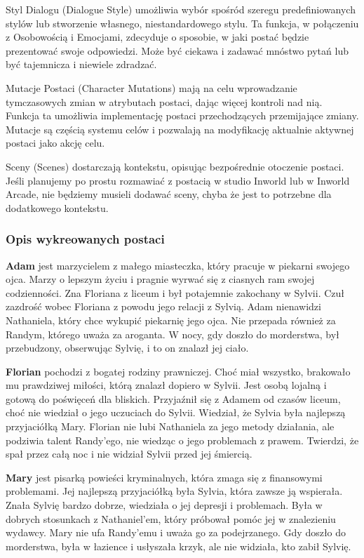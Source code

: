 Styl Dialogu (Dialogue Style) umożliwia wybór spośród szeregu predefiniowanych stylów lub stworzenie
własnego, niestandardowego stylu. Ta funkcja, w połączeniu z Osobowością i Emocjami, zdecyduje o
sposobie, w jaki postać będzie prezentować swoje odpowiedzi. Może być ciekawa i zadawać mnóstwo pytań
lub być tajemnicza i niewiele zdradzać.

Mutacje Postaci (Character Mutations) mają na celu wprowadzanie tymczasowych zmian w atrybutach
postaci, dając więcej kontroli nad nią. Funkcja ta umożliwia implementację postaci przechodzących
przemijające zmiany. Mutacje są częścią systemu celów i pozwalają na modyfikację aktualnie aktywnej
postaci jako akcję celu.

Sceny (Scenes) dostarczają kontekstu, opisując bezpośrednie otoczenie postaci. Jeśli planujemy po
prostu rozmawiać z postacią w studio Inworld lub w Inworld Arcade, nie będziemy musieli dodawać
sceny, chyba że jest to potrzebne dla dodatkowego kontekstu.

\subsubsection*{Opis wykreowanych postaci}

\textbf{Adam} jest marzycielem z małego miasteczka, który pracuje w piekarni swojego ojca. Marzy o lepszym
życiu i pragnie wyrwać się z ciasnych ram swojej codzienności. Zna Floriana z liceum i był
potajemnie zakochany w Sylvii. Czuł zazdrość wobec Floriana z powodu jego relacji z Sylvią.
Adam nienawidzi Nathaniela, który chce wykupić piekarnię jego ojca. Nie przepada również za
Randym, którego uważa za aroganta. W nocy, gdy doszło do morderstwa, był przebudzony, obserwując
Sylvię, i to on znalazł jej ciało.

\textbf{Florian} pochodzi z bogatej rodziny prawniczej. Choć miał wszystko, brakowało mu prawdziwej miłości,
którą znalazł dopiero w Sylvii. Jest osobą lojalną i gotową do poświęceń dla bliskich. Przyjaźnił
się z Adamem od czasów liceum, choć nie wiedział o jego uczuciach do Sylvii. Wiedział, że Sylvia
była najlepszą przyjaciółką Mary. Florian nie lubi Nathaniela za jego metody działania, ale
podziwia talent Randy'ego, nie wiedząc o jego problemach z prawem. Twierdzi, że spał przez całą
noc i nie widział Sylvii przed jej śmiercią.

\textbf{Mary} jest pisarką powieści kryminalnych, która zmaga się z finansowymi problemami. Jej najlepszą
przyjaciółką była Sylvia, która zawsze ją wspierała. Znała Sylvię bardzo dobrze, wiedziała o jej
depresji i problemach. Była w dobrych stosunkach z Nathaniel'em, który próbował pomóc jej w
znalezieniu wydawcy. Mary nie ufa Randy'emu i uważa go za podejrzanego. Gdy doszło do morderstwa,
była w łazience i usłyszała krzyk, ale nie widziała, kto zabił Sylvię.

